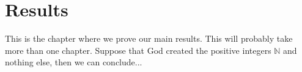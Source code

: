 \chapter{Results}


This is the  chapter where we prove our main results. This will probably take more than one chapter. Suppose that God created the  positive integers $\mathbb{N}$ and nothing else, then we can conclude...

